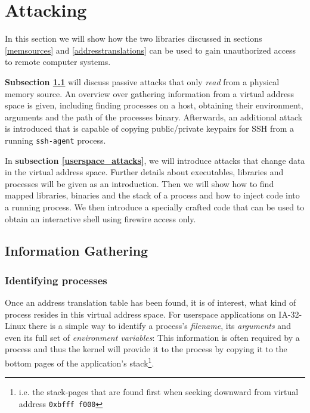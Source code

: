 %
%

\section{Attacking}

\label{attacks}

In this section we will show how the two libraries discussed in sections
\ref{memsources} and \ref{addresstranslations} can be used to gain unauthorized
access to remote computer systems.

\textbf{Subsection \ref{information_gathering}} will discuss passive attacks
that only \emph{read} from a physical memory source. An overview over gathering
information from a virtual address space is given, including finding processes
on a host, obtaining their environment, arguments and the path of the processes
binary.  Afterwards, an additional attack is introduced that is capable of
copying public/private keypairs for SSH from a running \texttt{ssh-agent}
process.

In \textbf{subsection \ref{userspace_attacks}}, we will introduce attacks that
change data in the virtual address space. Further details about executables,
libraries and processes will be given as an introduction. Then we will show how
to find mapped libraries, binaries and the stack of a process and how to inject
code into a running process. We then introduce a specially crafted code that can
be used to obtain an interactive shell using firewire access only.

\subsection{Information Gathering}

\label{information_gathering}

\subsubsection{Identifying processes}

\label{identifying_processes}  Once an address translation table has been found,
it is of interest, what kind of process resides in this virtual address space.
For userspace applications on IA-32-Linux there is a simple way to identify a
process's \emph{filename}, its \emph{arguments} and even its full set of
\emph{environment variables}: This information is often required by a process
and thus the kernel will provide it to the process by copying it to the bottom
pages of the application's stack\footnote{i.e.  the stack-pages that are found
first when seeking downward from virtual address \texttt{0xbfff~f000}}.

